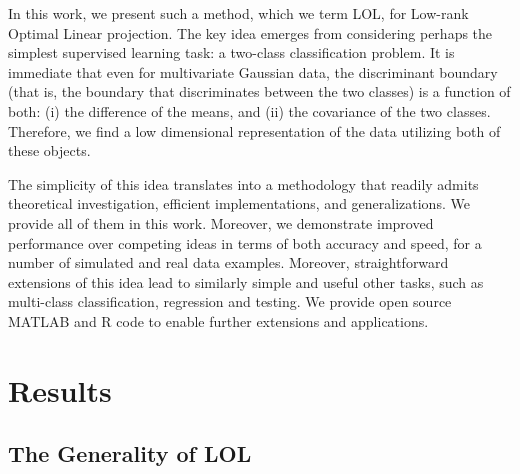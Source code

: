 \documentclass[10pt]{article}
\begin{document}
In this work, we present such a method, which we term LOL, for Low-rank Optimal Linear projection.  The key idea emerges from considering perhaps the simplest supervised learning task: a two-class classification problem.  It is immediate that even for multivariate Gaussian data, the discriminant boundary (that is, the boundary that discriminates between the two classes) is a function of both: (i) the difference of the means, and (ii) the covariance of the two classes.  Therefore, we find a low dimensional representation of the data utilizing both of these objects. 


The simplicity of this idea translates into a methodology that readily admits theoretical investigation, efficient implementations, and generalizations.  We provide all of them in this work.  Moreover, we demonstrate improved performance over competing ideas in terms of both accuracy and speed, for a number of simulated and real data examples.  Moreover, straightforward extensions of this idea lead to similarly simple and useful other tasks, such as multi-class classification, regression and testing.  We provide open source MATLAB and R code to enable further extensions and applications.






\section*{Results}



\subsection*{The Generality of LOL}
\end{document}
